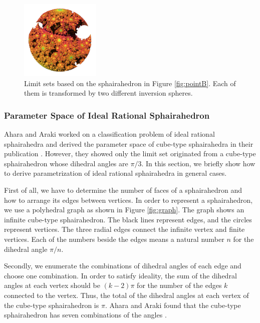 \begin{figure}[htbp]
\begin{minipage}[t]{0.5\textwidth}
\begin{minipage}[t]{0.24\textwidth}
  \end{minipage}
  \hspace*{\fill}
  \begin{minipage}[t]{0.24\textwidth}
   \centering
   \includegraphics[width=1.5in, height=1.5in,
   keepaspectratio]{./img/application/sphairahedron/derivation/conj2.png}
  \end{minipage}
  \hspace*{\fill}
  \caption{Limit sets based on the sphairahedron in Figure
  \ref{fig:pointB}.
  Each of them is transformed by two different inversion spheres.}
  \label{fig:conjugation}
 \end{minipage}
\end{figure}

\subsubsection{Parameter Space of Ideal Rational Sphairahedron}

\noindent
Ahara and Araki worked on a classification problem of ideal rational
sphairahedra and derived the parameter space of cube-type
sphairahedra in their publication
\cite{ahara2003sphairahedral}.
However, they showed only the limit set originated from a cube-type
sphairahedron whose dihedral angles are $\pi / 3$.
In this section, we briefly show how to derive parametrization of ideal
rational sphairahedra in general cases.

First of all, we have to determine the number of faces of a sphairahedron
and how to arrange its edges between vertices.
In order to represent a sphairahedron, we use a polyhedral graph as
shown in Figure \ref{fig:graph}.
The graph shows an infinite cube-type sphairahedron.
The black lines represent edges, and the circles represent vertices.
The three radial edges connect the infinite vertex and finite vertices.
Each of the numbers beside the edges means a natural number $n$ for the
dihedral angle $\pi / n$.

Secondly, we enumerate the combinations of dihedral angles of each edge and
choose one combination.
In order to satisfy ideality, the sum of the dihedral angles at each vertex
should be $(k - 2)\pi$ for the number of the edges $k$ connected to the
vertex.
Thus, the total of the dihedral angles at each vertex of the cube-type
sphairahedron is $\pi$. Ahara and Araki found that the cube-type
sphairahedron has seven combinations of the angles
\cite{ahara2003sphairahedral}.

